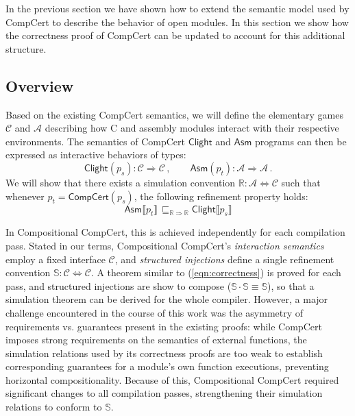 \documentclass{article}
\newcommand{\kw}[1]{\ensuremath{ \mathsf{#1} }}
\begin{document}
In the previous section
we have shown how to extend
the semantic model used by CompCert
to describe the behavior of open modules.
In this section
we show how the correctness proof of CompCert
can be updated to account for this additional structure.

\subsection{Overview} %

Based on the existing CompCert semantics,
we will define the elementary games
$\mathcal{C}$ and $\mathcal{A}$
describing how C and assembly modules
interact with their respective environments.
The semantics of CompCert $\kw{Clight}$ and $\kw{Asm}$ programs
can then be expressed as interactive behaviors of types:
\[
    \kw{Clight}(p_s) : \mathcal{C} \Rightarrow \mathcal{C} \,, \qquad
    \kw{Asm}(p_t) : \mathcal{A} \Rightarrow \mathcal{A} \,.
\]
We will show that there exists a simulation convention
$\mathbb{R} : \mathcal{A} \Leftrightarrow \mathcal{C}$
such that whenever $p_t = \kw{CompCert}(p_s)$,
the following refinement property holds:
\begin{equation}
    \label{eqn:correctness}
    \kw{Asm} \llbracket p_t \rrbracket
    \, \sqsubseteq_{\mathbb{R} \Rightarrow \mathbb{R}}
    \kw{Clight} \llbracket p_s \rrbracket
\end{equation}

In Compositional CompCert,
this is achieved independently for each compilation pass.
Stated in our terms,
Compositional CompCert's \emph{interaction semantics}
employ a fixed interface $\mathcal{C}$,
and \emph{structured injections} define a single refinement convention
$\mathbb{S} : \mathcal{C} \Leftrightarrow \mathcal{C}$.
A theorem similar to (\ref{eqn:correctness}) is proved for each pass,
and structured injections are show to compose
($\mathbb{S} \cdot \mathbb{S} \equiv \mathbb{S}$),
so that a simulation theorem can be derived for the whole compiler.
However,
a major challenge encountered in the course of this work
was the asymmetry of requirements vs. guarantees
present in the existing proofs:
while CompCert imposes strong requirements
on the semantics of external functions,
the simulation relations used by its correctness proofs
are too weak to establish corresponding guarantees
for a module's own function executions,
preventing horizontal compositionality.
Because of this,
Compositional CompCert required significant changes
to all compilation passes,
strengthening their simulation relations
to conform to $\mathbb{S}$.
\end{document}
